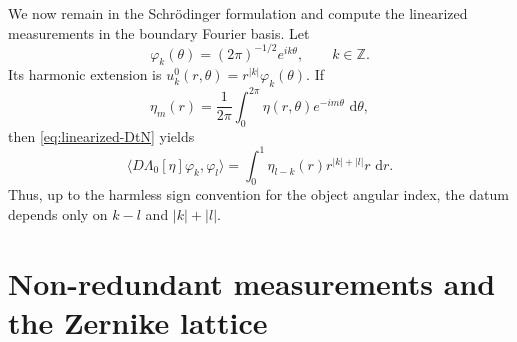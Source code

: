 \IfFileExists{iopjournal.cls}{\documentclass{iopjournal}}{\documentclass{iopjournal-draft}}
\theoremstyle{definition}
\theoremstyle{remark}
\newcommand{\dd}{\,\mathrm d}
\newcommand{\ip}[2]{\langle #1,#2\rangle}
\newcommand{\Z}{\mathbb Z}
\numberwithin{equation}{section}
\begin{document}
We now remain in the Schr\"odinger formulation and compute the
linearized measurements in the boundary Fourier basis.
Let
\begin{equation}
 \varphi_k(\theta)=(2\pi)^{-1/2}e^{ik\theta},\qquad k\in\Z.
 \label{eq:boundary-fourier}
\end{equation}
Its harmonic extension is $u_k^0(r,\theta)=r^{|k|}\varphi_k(\theta)$.  If
\[
 \eta_m(r)=\frac1{2\pi}\int_0^{2\pi}\eta(r,\theta)e^{-im\theta}\,\dd\theta,
\]
then \eqref{eq:linearized-DtN} yields
\begin{equation}
 \ip{D\Lambda_0[\eta]\varphi_k}{\varphi_l}
 =\int_0^1\eta_{l-k}(r)r^{|k|+|l|}r\,\dd r.
 \label{eq:fourier-matrix-element}
\end{equation}
Thus, up to the harmless sign convention for the object angular index, the datum depends only on $k-l$ and $|k|+|l|$.



\section{Non-redundant measurements and the Zernike lattice}
\label{sec:nonredundant}
\end{document}
